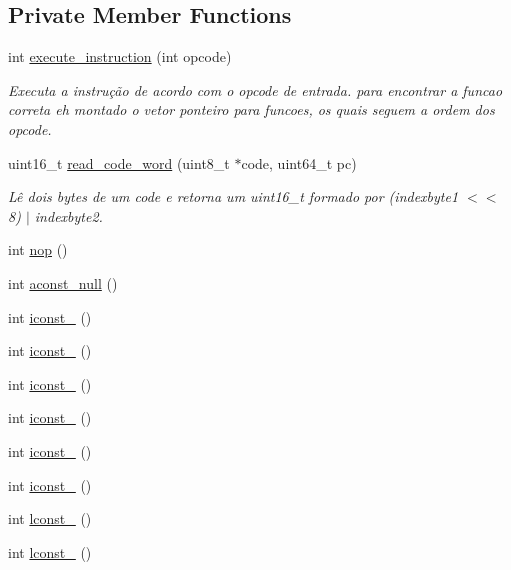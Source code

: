 \subsection*{Private Member Functions}
\begin{DoxyCompactItemize}
\item 
int \hyperlink{classInterpretador_a2bec82447756b2f6a43e68164ddbdde1}{execute\+\_\+instruction} (int opcode)
\begin{DoxyCompactList}\small\item\em Executa a instrução de acordo com o opcode de entrada. para encontrar a funcao correta eh montado o vetor ponteiro para funcoes, os quais seguem a ordem dos opcode. \end{DoxyCompactList}\item 
uint16\+\_\+t \hyperlink{classInterpretador_a5866535914b8b99ed234cdaaf4955679}{read\+\_\+code\+\_\+word} (uint8\+\_\+t $\ast$code, uint64\+\_\+t pc)
\begin{DoxyCompactList}\small\item\em Lê dois bytes de um code e retorna um uint16\+\_\+t formado por (indexbyte1 $<$$<$ 8) $\vert$ indexbyte2. \end{DoxyCompactList}\item 
int \hyperlink{classInterpretador_a745dc9db0dcfa3b29c7e2ffb913334e5}{nop} ()
\item 
int \hyperlink{classInterpretador_a267f0b0ee8bb8beb9652625edc59c44c}{aconst\+\_\+null} ()
\item 
int \hyperlink{classInterpretador_acfcf3696d6024de47ebb094fed5c2b9d}{iconst\+\_} ()
\item 
int \hyperlink{classInterpretador_a0fe3c7f8e24c6afbee4f43faf7a7e71d}{iconst\+\_} ()
\item 
int \hyperlink{classInterpretador_a1124b3ad68f47e7a3096684592f9f6f4}{iconst\+\_} ()
\item 
int \hyperlink{classInterpretador_a7bedf620cfe1e02d37f71bb836544c20}{iconst\+\_} ()
\item 
int \hyperlink{classInterpretador_a9e5b62bc83d901b010a1ecda87b59229}{iconst\+\_} ()
\item 
int \hyperlink{classInterpretador_a3bacd8de29bb545763401494853710ff}{iconst\+\_} ()
\item 
int \hyperlink{classInterpretador_a6044c1c66315a0e5a0ad787ea964f455}{lconst\+\_} ()
\item 
int \hyperlink{classInterpretador_a58acc549590fb43f3cf8b5e31a3820eb}{lconst\+\_} ()
\item 

\end{DoxyCompactItemize}
